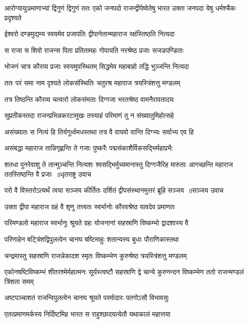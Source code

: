 \threelineshloka
{आरोग्यायुःप्रमाणाभ्यां द्विगुणं द्विगुणं ततः}
{एको जनपदो राजन्द्वीपेष्वेतेषु भारत}
{उक्ता जनपदा येषु धर्मश्चैकः प्रदृश्यते}


\twolineshloka
{ईश्वरो दण्डमुद्यम्य स्वयमेव प्रजापतिः}
{द्वीपानेतान्महाराज रक्षंस्तिष्ठति नित्यदा}


\twolineshloka
{स राजा स शिवो राजन्स पिता प्रतितामहः}
{गोपायति नरश्रेष्ठ प्रजाः सजडपण्डिताः}


\twolineshloka
{भोजनं चात्र कौरव्य प्रजाः स्वयमुपस्थितम्}
{सिद्धमेव महाबाहो तद्धि भुञ्जन्ति नित्यदा}


\twolineshloka
{ततः परं समा नाम दृश्यते लोकसंस्थितिः}
{चतुरश्र महाराज त्रयस्त्रिंशत्तु मण्डलम्}


\twolineshloka
{तत्र तिष्ठन्ति कौरव्य चत्वारो लोकसंमताः}
{दिग्गजा भरतश्रेष्ठ वामनैरावतादयः}


\twolineshloka
{सुप्रतीकस्तदा राजन्प्रभिन्नकरटामुखः}
{तस्याहं परिमाणं तु न संख्यातुमिहोत्सहे}


\twolineshloka
{असंख्यातः स नित्यं हि तिर्यगूर्ध्वमधस्तथा}
{तत्र वै वायवो वान्ति दिग्भ्यः सर्वाभ्य एव हि}


\twolineshloka
{असंबद्धा महाराज तान्निगृह्णन्ति ते गजाः}
{पुष्करैः पद्मसंकाशैर्विकसद्भिर्महाप्रभैः}


\fourlineindentedshloka
{शतधा पुनरेवाशु ते तान्मुञ्चन्ति नित्यशः}
{श्वसद्भिर्मुच्यमानास्तु दिग्गजैरिह मारुताः}
{आगच्छन्ति महाराज ततस्तिष्ठन्ति वै प्रजाः ॥धृतराष्ट्र उवाच}
{}


\threelineshloka
{परो वै विस्तरोऽत्यर्थं त्वया सञ्जय कीर्तितः}
{दर्शितं द्वीपसंस्थानमुत्तरं ब्रूहि सञ्जय ॥सञ्जय उवाच}
{}


\twolineshloka
{उक्ता द्वीपा महाराज ग्रहं वै शृणु तत्त्वतः}
{स्वर्भानोः कौरवश्रेष्ठ यावदेव प्रमाणतः}


\twolineshloka
{परिमण्डलो महाराज स्वर्भानुः श्रूयते ग्रहः}
{योजनानां सहस्राणि विष्कम्भो द्वादशास्य वै}


\twolineshloka
{परिणाहेन षट्त्रिंशद्विपुलत्वेन चानघ}
{षष्टिमाहुः शतान्यस्य बुधाः पौराणिकास्तथा}


\twolineshloka
{चन्द्रमास्तु सहस्राणि राजन्नेकादश स्मृतः}
{विष्कम्भेण कुरुश्रेष्ठ त्रयस्त्रिंशत्तु मण्डलम्}


एकोनषष्टिविष्कम्भं शीतरश्मेर्महात्मनः
\twolineshloka
{सूर्यस्त्वष्टौ सहस्राणि द्वे चान्ये कुरुनन्दन}
{विष्कम्भेण ततो राजन्मण्डलं त्रिंशता समम्}


\twolineshloka
{अष्टपञ्चाशतं राजन्विपुलत्वेन चानघ}
{श्रूयते परमोदारः पतगोऽसौ विभावसुः}


\twolineshloka
{एतत्प्रमाणमर्कस्य निर्दिष्टमिह भारत}
{स राहुश्छादयत्येतौ यथाकालं महात्तया}


